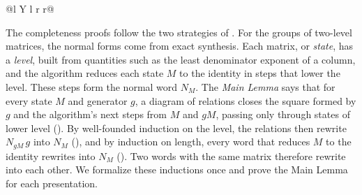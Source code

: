 \documentclass[acmsmall,nonacm,11pt,screen]{acmart}
\begin{document}
\begin{table}[H]
\begin{tabularx}{\linewidth}{@{}l Y l r r@{}}
\bottomrule
\end{tabularx}
\captionsetup{position=bottom}
\caption{Completeness and minimality results formalized in QCert. A presentation gives generators and relations for a whole group, and a sub-presentation for the subgroup generated by the gate set named in the Object column of the Circuits block. $L_n$ is the group of orthogonal matrices $N/\sqrt2^{\,j}$, where $N$ is an integer matrix and $j \ge 0$. Mod denotes the number of Agda modules, the units that Agda checks one at a time. Time records their typechecking time in seconds from scratch, measured with Agda~2.8 on an Intel Core i5-14400. Mod and Time consider only each row's own modules, not the shared library or the formalizations it builds on.}
\label{tab:corpus}
\end{table}

\vspace{-.4 cm}

\iffalse
The completeness proofs follow the two strategies of . For the groups of two-level matrices, the normal forms come from exact synthesis. Each matrix, or \emph{state}, has a \emph{level}, built from quantities such as the least denominator exponent of a column, and the algorithm reduces each state $M$ to the identity in steps that lower the level. These steps form the normal word $N_M$. The \emph{Main Lemma} says that for every state $M$ and generator $g$, a diagram of relations closes the square formed by $g$ and the algorithm's next steps from $M$ and $gM$, passing only through states of lower level (). By well-founded induction on the level, the relations then rewrite $N_{gM}\,g$ into $N_M$ (), and by induction on length, every word that reduces $M$ to the identity rewrites into $N_M$ (). Two words with the same matrix therefore rewrite into each other. We formalize these inductions once and prove the Main Lemma for each presentation.
\end{document}
